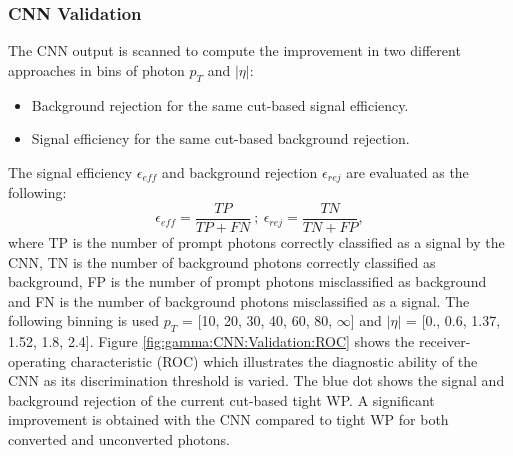 \subsubsection{CNN Validation}
\label{gamma:CNN:Validation}
The CNN output is scanned to compute the improvement in two different approaches in bins of photon $p_T$ and $|\eta|$: 
\begin{itemize}
    \item Background rejection for the same cut-based signal efficiency.
    \item Signal efficiency for the same cut-based background rejection.
\end{itemize} 
The signal efficiency $\epsilon_{eff}$ and background rejection $\epsilon_{rej}$ are evaluated as the following:
\begin{equation}
    \label{eq:eff}
    \epsilon_{eff} = \frac{TP}{TP+FN} \ ; \ \epsilon_{rej} = \frac{TN}{TN+FP},
\end{equation}
where TP is the number of prompt photons correctly classified as a signal by the CNN, TN is the number of background photons correctly classified as background, FP is the number of prompt photons misclassified as background and FN is the number of background photons misclassified as a signal. The following binning is used $p_T$ = [10, 20, 30, 40, 60, 80, $\infty$] and $|\eta|$ = [0., 0.6, 1.37, 1.52, 1.8, 2.4].
Figure \ref{fig:gamma:CNN:Validation:ROC} shows the receiver-operating characteristic (ROC) which illustrates the diagnostic ability of the CNN as its discrimination threshold is varied. The blue dot shows the signal and background rejection of the current cut-based tight WP. A significant improvement is obtained with the CNN compared to tight WP for both converted and unconverted photons. 
